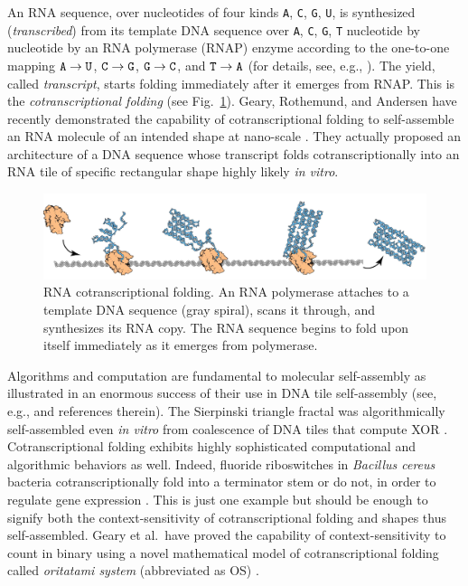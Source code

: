 \documentclass[dvipdfmx,review]{elsarticle}
\begin{document}
An RNA sequence, over nucleotides of four kinds {\tt A}, {\tt C}, {\tt G}, {\tt U}, is synthesized (\textit{transcribed}) from its template DNA sequence over {\tt A}, {\tt C}, {\tt G}, {\tt T} nucleotide by nucleotide by an RNA polymerase (RNAP) enzyme according to the one-to-one mapping ${\tt A} \to {\tt U}$, ${\tt C} \to {\tt G}$, ${\tt G} \to {\tt C}$, and ${\tt T} \to {\tt A}$ (for details, see, e.g., \cite{AJLMRRW2014}). 
The yield, called \textit{transcript}, starts folding immediately after it emerges from RNAP. 
This is the \textit{cotranscriptional folding} (see Fig.~\ref{fig:rna_origami}). 
Geary, Rothemund, and Andersen have recently demonstrated the capability of cotranscriptional folding to self-assemble an RNA molecule of an intended shape at nano-scale \cite{GearyRothemundAndersen2014}. 
They actually proposed an architecture of a DNA sequence whose transcript folds cotranscriptionally into an RNA tile of specific rectangular shape highly likely \textit{in vitro}. 

\begin{figure}[tb]
\centering
\includegraphics[width=0.8\linewidth]{Figs/rna_origami.pdf}
\caption{RNA cotranscriptional folding. 
An RNA polymerase attaches to a template DNA sequence (gray spiral), scans it through, and synthesizes its RNA copy. 
The RNA sequence begins to fold upon itself immediately as it emerges from polymerase. 
}
\label{fig:rna_origami}
\end{figure}

Algorithms and computation are fundamental to molecular self-assembly as illustrated in an enormous success of their use in DNA tile self-assembly (see, e.g., \cite{Doty2012,Patitz2016,WinfreePhD} and references therein). 
The Sierpinski triangle fractal was algorithmically self-assembled even \textit{in vitro} from coalescence of DNA tiles that compute XOR \cite{RothemundPapadakisWinfree2004}. 
Cotranscriptional folding exhibits highly sophisticated computational and algorithmic behaviors as well. 
Indeed, fluoride riboswitches in \textit{Bacillus cereus} bacteria cotranscriptionally fold into a terminator stem or do not, in order to regulate gene expression \cite{WaStYuLiLu2016}. %
This is just one example but should be enough to signify both the context-sensitivity of cotranscriptional folding and shapes thus self-assembled. 
Geary et al.~have proved the capability of context-sensitivity to count in binary using a novel mathematical model of cotranscriptional folding called \textit{oritatami system} (abbreviated as OS) \cite{GeMeScSe2016}. 
\end{document}
